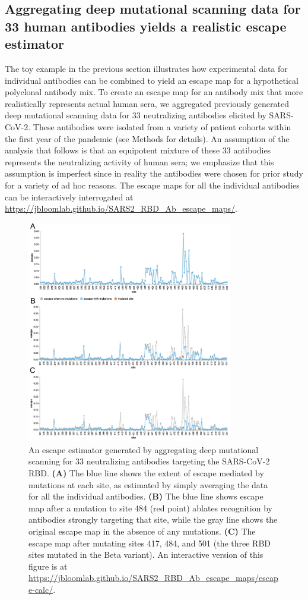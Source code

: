 \documentclass[9pt,twocolumn,twoside]{gsajnl_modified}
\begin{document}
\subsection{Aggregating deep mutational scanning data for 33 human antibodies yields a realistic escape estimator}
The toy example in the previous section illustrates how experimental data for individual antibodies can be combined to yield an escape map for a hypothetical polyclonal antibody mix.
To create an escape map for an antibody mix that more realistically represents actual human sera, we aggregated previously generated deep mutational scanning data for 33 neutralizing antibodies elicited by SARS-CoV-2.
These antibodies were isolated from a variety of patient cohorts within the first year of the pandemic (see Methods for details).
An assumption of the analysis that follows is that an equipotent mixture of these 33 antibodies represents the neutralizing activity of human sera; we emphasize that this assumption is imperfect since in reality the antibodies were chosen for prior study for a variety of ad hoc reasons.
The escape maps for all the individual antibodies can be interactively interrogated at \url{https://jbloomlab.github.io/SARS2_RBD_Ab_escape_maps/}.

\begin{figure}
\includegraphics[width=0.8\textwidth]{figures/escape_calc/escape_calc.pdf}
\caption{
An escape estimator generated by aggregating deep mutational scanning for 33 neutralizing antibodies targeting the SARS-CoV-2 RBD.
{\bf (A)} The blue line shows the extent of escape mediated by mutations at each site, as estimated by simply averaging the data for all the individual antibodies.
{\bf (B)} The blue line shows escape map after a mutation to site 484 (red point) ablates recognition by antibodies strongly targeting that site, while the gray line shows the original escape map in the absence of any mutations.
{\bf (C)} The escape map after mutating sites 417, 484, and 501 (the three RBD sites mutated in the Beta variant).
An interactive version of this figure is at \url{https://jbloomlab.github.io/SARS2_RBD_Ab_escape_maps/escape-calc/}.}
\label{fig:escape_calc}
\end{figure}
\end{document}
